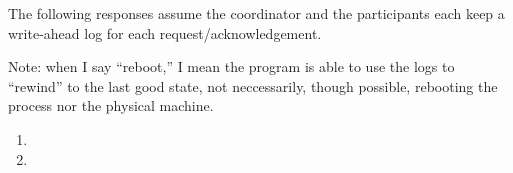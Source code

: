 The following responses assume the coordinator and the participants each keep a write-ahead log for each request/acknowledgement.

Note: when I say ``reboot,'' I mean the program is able to use the logs to ``rewind'' to the last good state, not neccessarily, though possible, rebooting the process nor the physical machine.
\begin{enumerate}[1]
\item
\item
\end{enumerate}
